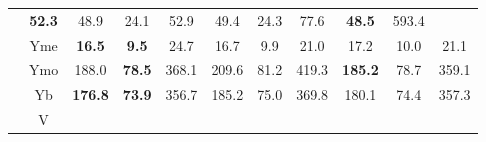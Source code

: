 \documentclass[french,10pt]{article}
\begin{document}
\begin{landscape}
\begin{longtable}{ l c | c c c | c c c | c c c | }
    &                                         \textbf{ 52.3}
    & {\footnotesize                         48.9
    } & {\footnotesize                         24.1
    }


    & 52.9
    & {\footnotesize                         49.4
    } & {\footnotesize                         24.3
    }


    & 77.6
    & {\footnotesize                         \textbf{ 48.5}
    } & {\footnotesize                         593.4
    }
    
    
                    \\*
    & {\small Yme  }

    &                                         \textbf{ 16.5}
    & {\footnotesize                         \textbf{ 9.5}
    } & {\footnotesize                         24.7
    }


    & 16.7
    & {\footnotesize                         9.9
    } & {\footnotesize                         21.0
    }


    & 17.2
    & {\footnotesize                         10.0
    } & {\footnotesize                         21.1
    }


    \\*
    & {\small Ymo  }

    & 188.0
    & {\footnotesize                         \textbf{ 78.5}
    } & {\footnotesize                         368.1
    }


    & 209.6
    & {\footnotesize                         81.2
    } & {\footnotesize                         419.3
    }


    &                                         \textbf{ 185.2}
    & {\footnotesize                         78.7
    } & {\footnotesize                         359.1
    }
    
    
                    \\*
                        & {\small Yb  }

    &                                         \textbf{ 176.8}
    & {\footnotesize                         \textbf{ 73.9}
    } & {\footnotesize                         356.7
    }


    & 185.2
    & {\footnotesize                         75.0
    } & {\footnotesize                         369.8
    }


    & 180.1
    & {\footnotesize                         74.4
    } & {\footnotesize                         357.3
    }
    
    
                    \\*
                        & {\small V  }


\end{longtable}
\end{landscape}
\end{document}
